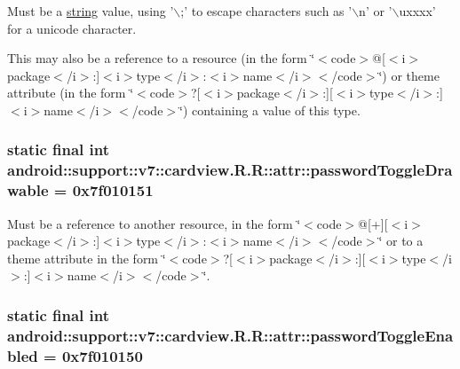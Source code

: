 Must be a \hyperlink{classandroid_1_1support_1_1v7_1_1cardview_1_1_r_1_1string}{string} value, using '$\backslash$;' to escape characters such as '$\backslash$n' or '$\backslash$uxxxx' for a unicode character. 

This may also be a reference to a resource (in the form \char`\"{}$<$code$>$@\mbox{[}$<$i$>$package$<$/i$>$:\mbox{]}$<$i$>$type$<$/i$>$:$<$i$>$name$<$/i$>$$<$/code$>$\char`\"{}) or theme attribute (in the form \char`\"{}$<$code$>$?\mbox{[}$<$i$>$package$<$/i$>$:\mbox{]}\mbox{[}$<$i$>$type$<$/i$>$:\mbox{]}$<$i$>$name$<$/i$>$$<$/code$>$\char`\"{}) containing a value of this type. \hypertarget{classandroid_1_1support_1_1v7_1_1cardview_1_1_r_1_1attr_25149de4924974167b8dc2bb764900bc}{
\subsubsection[{passwordToggleDrawable}]{\setlength{\rightskip}{0pt plus 5cm}static final int android::support::v7::cardview.R.R::attr::passwordToggleDrawable = 0x7f010151}}
\label{classandroid_1_1support_1_1v7_1_1cardview_1_1_r_1_1attr_25149de4924974167b8dc2bb764900bc}


Must be a reference to another resource, in the form \char`\"{}$<$code$>$@\mbox{[}+\mbox{]}\mbox{[}$<$i$>$package$<$/i$>$:\mbox{]}$<$i$>$type$<$/i$>$:$<$i$>$name$<$/i$>$$<$/code$>$\char`\"{} or to a theme attribute in the form \char`\"{}$<$code$>$?\mbox{[}$<$i$>$package$<$/i$>$:\mbox{]}\mbox{[}$<$i$>$type$<$/i$>$:\mbox{]}$<$i$>$name$<$/i$>$$<$/code$>$\char`\"{}. \hypertarget{classandroid_1_1support_1_1v7_1_1cardview_1_1_r_1_1attr_3621bc59ef043c467d8154464f1582dd}{
\subsubsection[{passwordToggleEnabled}]{\setlength{\rightskip}{0pt plus 5cm}static final int android::support::v7::cardview.R.R::attr::passwordToggleEnabled = 0x7f010150}}
\label{classandroid_1_1support_1_1v7_1_1cardview_1_1_r_1_1attr_3621bc59ef043c467d8154464f1582dd}


